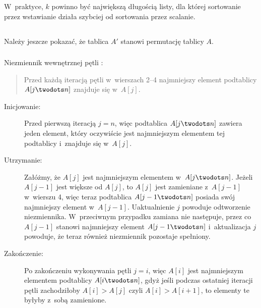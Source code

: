 \subsubsection{} %
W~praktyce, $k$ powinno być największą długością listy, dla której sortowanie przez wstawianie działa szybciej od sortowania przez scalanie.

\subsection{} %

\subsubsection{} %
Należy jeszcze pokazać, że tablica $A'$ stanowi permutację tablicy $A$.

\subsubsection{} %
Niezmiennik wewnętrznej pętli :
\begin{quote}
Przed każdą iteracją pętli  w~wierszach 2--4 najmniejszy element podtablicy $A[j\twodots n]$ znajduje się w~$A[j]$.
\end{quote}
\begin{description}
	\item[Inicjowanie:] Przed pierwszą iteracją $j=n$, więc podtablica $A[j\twodots n]$ zawiera jeden element, który oczywiście jest najmniejszym elementem tej podtablicy i~znajduje się w~$A[j]$.
	\item[Utrzymanie:] Załóżmy, że $A[j]$ jest najmniejszym elementem w~$A[j\twodots n]$. Jeżeli $A[j-1]$ jest większe od $A[j]$, to $A[j]$ jest zamieniane z~$A[j-1]$ w~wierszu 4, więc teraz podtablica $A[j-1\twodots n]$ posiada swój najmniejszy element w~$A[j-1]$. Uaktualnienie $j$ powoduje odtworzenie niezmiennika. W~przeciwnym przypadku zamiana nie następuje, przez co $A[j-1]$ stanowi najmniejszy element $A[j-1\twodots n]$ i~aktualizacja $j$ powoduje, że teraz również niezmiennik pozostaje spełniony.
	\item[Zakończenie:] Po zakończeniu wykonywania pętli $j=i$, więc $A[i]$ jest najmniejszym elementem podtablicy $A[i\twodots n]$, gdyż jeśli podczas ostatniej iteracji pętli zachodziłoby $A[i]>A[j]$ czyli $A[i]>A[i+1]$, to elementy te byłyby z~sobą zamienione.
\end{description}

